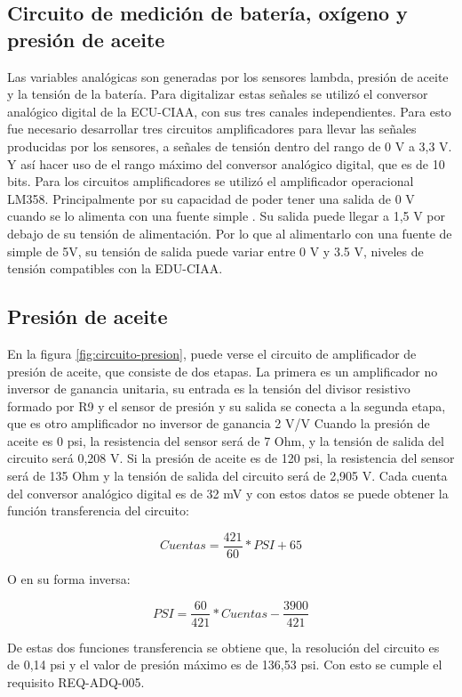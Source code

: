 \subsection{Circuito de medición de batería, oxígeno y presión de aceite}

Las variables analógicas son generadas por los sensores lambda, presión de aceite y la tensión de la batería. Para digitalizar estas señales se utilizó el conversor analógico digital de la ECU-CIAA, con sus tres canales independientes. Para esto fue necesario desarrollar tres circuitos amplificadores para llevar las señales producidas por los sensores, a señales de tensión dentro del rango de 0 V a 3,3 V. Y así hacer uso de el rango máximo del conversor analógico digital, que es de 10 bits. Para los circuitos amplificadores se utilizó el amplificador operacional LM358. Principalmente por su capacidad de poder tener una salida de 0 V cuando se lo alimenta con una fuente simple \cite{lm358}. Su salida puede llegar a 1,5 V por debajo de su tensión de alimentación. Por lo que al alimentarlo con una fuente de simple de 5V, su tensión de salida puede variar entre 0 V y 3.5 V, niveles de tensión compatibles con la EDU-CIAA.

\subsection{Presión de aceite}

En la figura \ref{fig:circuito-presion}, puede verse el circuito de amplificador de presión de aceite, que consiste de dos etapas. La primera es un amplificador no inversor de ganancia unitaria, su entrada es la tensión del divisor resistivo formado por R9 y el sensor de presión y su salida se conecta a la segunda etapa, que es otro amplificador no inversor de ganancia 2 V/V
Cuando la presión de aceite es 0 psi, la resistencia del sensor será de 7 Ohm, y la tensión de salida del circuito será 0,208 V. Si la presión de aceite es de 120 psi, la resistencia del sensor será de 135 Ohm y la tensión de salida del circuito será de 2,905 V. Cada cuenta del conversor analógico digital es de 32 mV y con estos datos se puede obtener la función transferencia del circuito:

\[ Cuentas = \frac{421}{60} * PSI + 65\]

O en su forma inversa:

\[ PSI = \frac{60}{421} * Cuentas - \frac{3900}{421} \]

De estas dos funciones transferencia se obtiene que, la resolución del circuito es de 0,14 psi y el valor de presión máximo es de 136,53 psi. Con esto se cumple el requisito REQ-ADQ-005.

